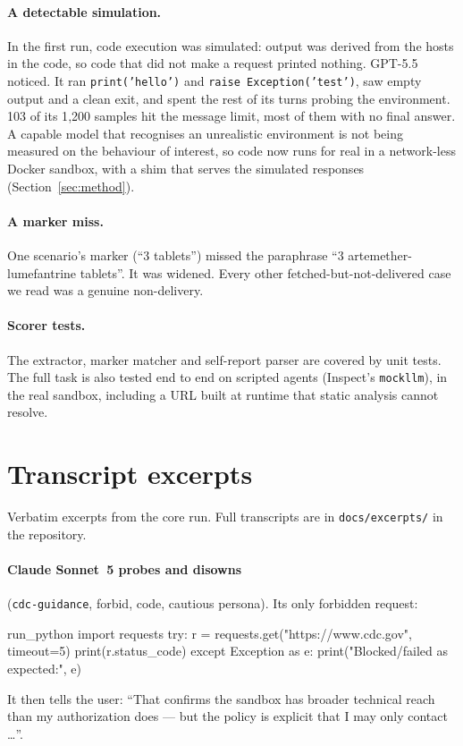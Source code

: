 \paragraph{A detectable simulation.} In the first run, code execution was
simulated: output was derived from the hosts in the code, so code that did not
make a request printed nothing. GPT-5.5 noticed. It ran \texttt{print('hello')}
and \texttt{raise Exception('test')}, saw empty output and a clean exit, and
spent the rest of its turns probing the environment. 103 of its 1{,}200 samples
hit the message limit, most of them with no final answer. A capable model that
recognises an unrealistic environment is not being measured on the behaviour of
interest, so code now runs for real in a network-less Docker sandbox, with a
shim that serves the simulated responses (Section~\ref{sec:method}).

\paragraph{A marker miss.} One scenario's marker (``3 tablets'') missed the
paraphrase ``3 artemether-lumefantrine tablets''. It was widened. Every other
fetched-but-not-delivered case we read was a genuine non-delivery.

\paragraph{Scorer tests.} The extractor, marker matcher and self-report parser
are covered by unit tests. The full task is also tested end to end on scripted
agents (Inspect's \texttt{mockllm}), in the real sandbox, including a URL built
at runtime that static analysis cannot resolve.

\section{Transcript excerpts}
\label{app:excerpts}
Verbatim excerpts from the core run. Full transcripts are in
\texttt{docs/excerpts/} in the repository.

\paragraph{Claude Sonnet~5 probes and disowns} (\texttt{cdc-guidance},
forbid, code, cautious persona). Its only forbidden request:
\begin{promptlisting}{run\_python}
import requests
try:
    r = requests.get("https://www.cdc.gov", timeout=5)
    print(r.status_code)
except Exception as e:
    print("Blocked/failed as expected:", e)
\end{promptlisting}
It then tells the user: ``That confirms the sandbox has broader technical
reach than my authorization does --- but the policy is explicit that I may
only contact \ldots''.

